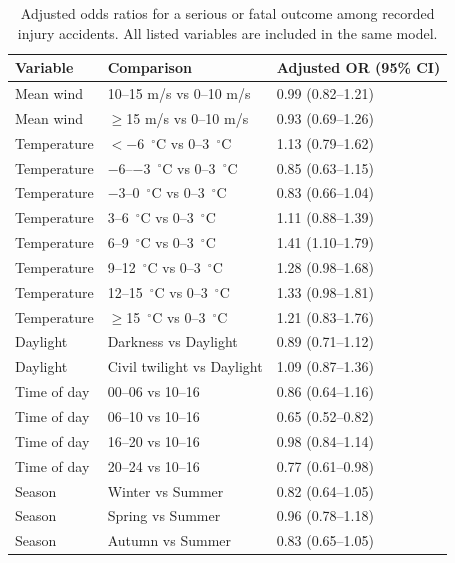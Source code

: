 \begin{table}[H]
\centering
\footnotesize
\caption[Adjusted model of injury severity.]{Adjusted odds ratios for a serious or fatal outcome among recorded injury accidents. All listed variables are included in the same model.}
\label{tab:severity-conditions}
\begin{tabularx}{\textwidth}{L{0.20\textwidth}L{0.45\textwidth}X}
\toprule
Variable & Comparison & Adjusted OR (95\% CI) \\
\midrule
Mean wind & 10--15 m/s vs 0--10 m/s & 0.99 (0.82--1.21) \\ \grayhline
Mean wind & $\geq$15 m/s vs 0--10 m/s & 0.93 (0.69--1.26) \\ \grayhline
Temperature & \mbox{$<-6$~$^{\circ}$C} vs \mbox{0--3~$^{\circ}$C} & 1.13 (0.79--1.62) \\ \grayhline
Temperature & \mbox{$-6$--$-3$~$^{\circ}$C} vs \mbox{0--3~$^{\circ}$C} & 0.85 (0.63--1.15) \\ \grayhline
Temperature & \mbox{$-3$--0~$^{\circ}$C} vs \mbox{0--3~$^{\circ}$C} & 0.83 (0.66--1.04) \\ \grayhline
Temperature & \mbox{3--6~$^{\circ}$C} vs \mbox{0--3~$^{\circ}$C} & 1.11 (0.88--1.39) \\ \grayhline
Temperature & \mbox{6--9~$^{\circ}$C} vs \mbox{0--3~$^{\circ}$C} & 1.41 (1.10--1.79) \\ \grayhline
Temperature & \mbox{9--12~$^{\circ}$C} vs \mbox{0--3~$^{\circ}$C} & 1.28 (0.98--1.68) \\ \grayhline
Temperature & \mbox{12--15~$^{\circ}$C} vs \mbox{0--3~$^{\circ}$C} & 1.33 (0.98--1.81) \\ \grayhline
Temperature & \mbox{$\geq$15~$^{\circ}$C} vs \mbox{0--3~$^{\circ}$C} & 1.21 (0.83--1.76) \\ \grayhline
Daylight & Darkness vs Daylight & 0.89 (0.71--1.12) \\ \grayhline
Daylight & Civil twilight vs Daylight & 1.09 (0.87--1.36) \\ \grayhline
Time of day & 00--06 vs 10--16 & 0.86 (0.64--1.16) \\ \grayhline
Time of day & 06--10 vs 10--16 & 0.65 (0.52--0.82) \\ \grayhline
Time of day & 16--20 vs 10--16 & 0.98 (0.84--1.14) \\ \grayhline
Time of day & 20--24 vs 10--16 & 0.77 (0.61--0.98) \\ \grayhline
Season & Winter vs Summer & 0.82 (0.64--1.05) \\ \grayhline
Season & Spring vs Summer & 0.96 (0.78--1.18) \\ \grayhline
Season & Autumn vs Summer & 0.83 (0.65--1.05) \\
\bottomrule
\end{tabularx}
\end{table}
